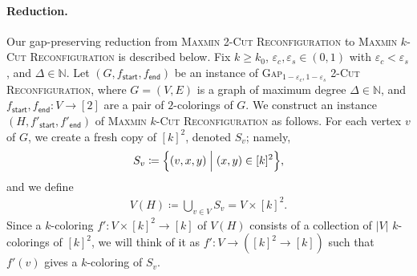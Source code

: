 \documentclass[11pt,fleqn]{article}
\renewcommand{\geq}{\geqslant}
\renewcommand{\epsilon}{\varepsilon}
\newcommand{\prb}[1]{\textsc{#1}\xspace}
\newcommand{\defeq}{\coloneq}
\newcommand{\sss}{\mathsf{start}}
\newcommand{\ttt}{\mathsf{end}}
\newcommand{\f}{f}
\newcommand{\MMkCutReconf}{\prb{Maxmin $k$-Cut Reconfiguration}}
\newcommand{\twoCutReconf}{\prb{2-Cut Reconfiguration}}
\newcommand{\MMtwoCutReconf}{\prb{Maxmin 2-Cut Reconfiguration}}
\newcommand{\bbN}{\mathbb{N}}
\theoremstyle{definition}
\numberwithin{equation}{section}
\begin{document}
\paragraph{Reduction.}
Our gap-preserving reduction from \MMtwoCutReconf to \MMkCutReconf is described below.
Fix $k \geq k_0$,
$\epsilon_c,\epsilon_s \in (0,1)$ with $\epsilon_c < \epsilon_s$, and
$\Delta \in \bbN$.
Let $(G,\f_\sss,\f_\ttt)$ be an instance of \prb{Gap$_{1-\epsilon_c, 1-\epsilon_s}$ \twoCutReconf}, where
$G=(V,E)$ is a graph of maximum degree $\Delta \in \bbN$, and
$\f_\sss,\f_\ttt \colon V \to [2]$ are a pair of $2$-colorings of $G$.
We construct an instance $(H,\f'_\sss,\f'_\ttt)$ of \MMkCutReconf as follows.
For each vertex $v$ of $G$,
we create a fresh copy of $[k]^2$, denoted $S_v$; namely,
\begin{align}
    S_v \defeq \Bigl\{
        (v,x,y) \Bigm| (x,y) \in [k]^2
    \Bigr\},
\end{align}
and we define
\begin{align}
    V(H) \defeq \bigcup_{v \in V} S_v = V \times [k]^2.
\end{align}
Since a $k$-coloring $\f' \colon V \times [k]^2 \to [k]$ of $V(H)$
consists of a collection of $|V|$ $k$-colorings of $[k]^2$,
we will think of it as $\f' \colon V \to ([k]^2 \to [k])$ such that
$\f'(v)$ gives a $k$-coloring of $S_v$.
\end{document}
